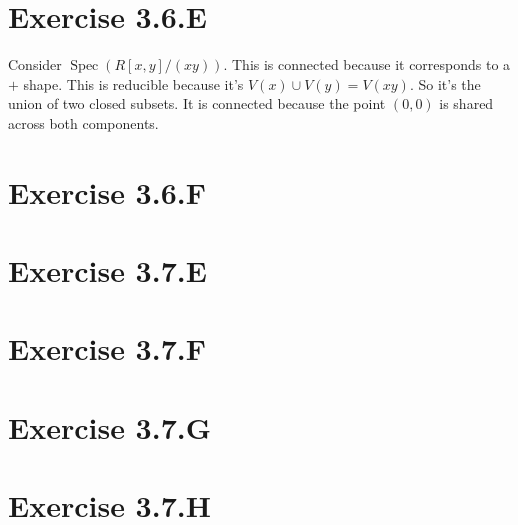 \documentclass{book}
\newcommand{\Spec}{\operatorname{Spec}}
\theoremstyle{definition}
\begin{document}
\section{Exercise 3.6.E}
Consider $\Spec(R[x, y]/(xy))$. This is connected because it corresponds
to a $+$ shape. This is reducible because it's $V(x) \cup V(y) = V(xy)$.
So it's the union of two closed subsets. It is connected because
the point $(0, 0)$ is shared across both components.

\section{Exercise 3.6.F}

\section{Exercise 3.7.E}
\section{Exercise 3.7.F}
\section{Exercise 3.7.G}
\section{Exercise 3.7.H}
\end{document}
